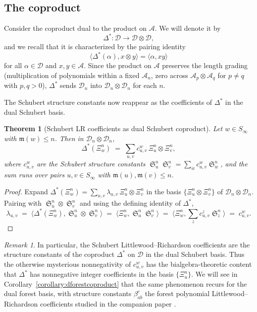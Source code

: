 \documentclass{amsart}
\newtheorem{theorem}{Theorem}[section]
\theoremstyle{definition}
\theoremstyle{remark}
\newtheorem*{remark}{Remark}
\numberwithin{equation}{subsection}
\DeclareMathOperator{\sch}{\mathfrak{S}}
\newcommand{\dsch}{\ensuremath{\Xi}}
\newcommand{\coma}{\mathcal{A}}
\newcommand{\dcoma}{\mathcal{D}}
\newcommand{\maxd}{\mathfrak{m}}
\begin{document}
\subsection{The coproduct}

Consider the coproduct dual to the product on $\coma$. We will denote it by
$$\Delta^*:\dcoma\to \dcoma\otimes\dcoma,$$
and we recall that it is characterized by the pairing identity
$$\langle \Delta^*(\alpha), x\otimes y\rangle = \langle \alpha, xy\rangle$$
for all $\alpha\in\dcoma$ and $x,y\in\coma$. Since the product on $\coma$ preserves the length grading (multiplication of polynomials within a fixed $\coma_n$, zero across $\coma_p\otimes\coma_q$ for $p\neq q$ with $p,q>0$), $\Delta^*$ sends $\dcoma_n$ into $\dcoma_n\otimes\dcoma_n$ for each $n$.

The Schubert structure constants now reappear as the coefficients of $\Delta^*$ in the dual Schubert basis.

\begin{theorem}[Schubert LR coefficients as dual Schubert coproduct]\label{theorem:dschcoproduct}
Let $w\in S_\infty$ with $\maxd(w)\leq n$. Then in $\dcoma_n\otimes\dcoma_n$,
$$\Delta^*(\dsch_w^n) \;=\; \sum_{u,v} c_{u,v}^w\, \dsch_u^n\otimes \dsch_v^n,$$
where $c_{u,v}^w$ are the Schubert structure constants $\sch_u^n\sch_v^n=\sum_w c_{u,v}^w\sch_w^n$, and the sum runs over pairs $u,v\in S_\infty$ with $\maxd(u),\maxd(v)\leq n$.
\end{theorem}
\begin{proof}
Expand $\Delta^*(\dsch_w^n) = \sum_{u,v}\lambda_{u,v}\,\dsch_u^n\otimes\dsch_v^n$ in the basis $\{\dsch_u^n\otimes\dsch_v^n\}$ of $\dcoma_n\otimes\dcoma_n$. Pairing with $\sch_u^n\otimes\sch_v^n$ and using the defining identity of $\Delta^*$,
$$\lambda_{u,v}\;=\;\langle \Delta^*(\dsch_w^n), \sch_u^n\otimes\sch_v^n\rangle\;=\;\langle \dsch_w^n,\sch_u^n\sch_v^n\rangle\;=\;\langle \dsch_w^n,\textstyle\sum_z c_{u,v}^z \sch_z^n\rangle\;=\;c_{u,v}^w.$$
\end{proof}

\begin{remark}
In particular, the Schubert Littlewood--Richardson coefficients are the structure constants of the coproduct $\Delta^*$ on $\dcoma$ in the dual Schubert basis. Thus the otherwise mysterious nonnegativity of $c_{u,v}^w$ has the bialgebra-theoretic content that $\Delta^*$ has nonnegative integer coefficients in the basis $\{\dsch_u^n\}$. We will see in Corollary~\ref{corollary:dforestcoproduct} that the same phenomenon recurs for the dual forest basis, with structure constants $\beta_{ab}^c$ the forest polynomial Littlewood--Richardson coefficients studied in the companion paper \cite{companionforest}.
\end{remark}
\end{document}
